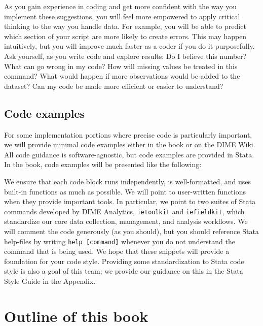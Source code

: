 As you gain experience in coding
and get more confident with the way you implement these suggestions,
you will feel more empowered to apply critical thinking to the way you handle data.
For example, you will be able to predict which section
of your script are more likely to create errors.
This may happen intuitively, but you will improve much faster as a coder
if you do it purposefully.
Ask yourself, as you write code and explore results:
Do I believe this number?
What can go wrong in my code?
How will missing values be treated in this command?
What would happen if more observations would be added to the dataset?
Can my code be made more efficient or easier to understand?

\subsection{Code examples}
For some implementation portions where precise code is particularly important,
we will provide minimal code examples either in the book or on the DIME Wiki.
All code guidance is software-agnostic, but code examples are provided in Stata.
In the book, code examples will be presented like the following:


We ensure that each code block runs independently, is well-formatted,
and uses built-in functions as much as possible.
We will point to user-written functions when they provide important tools.
In particular, we point to two suites of Stata commands developed by DIME Analytics,
\texttt{ietoolkit} and
\texttt{iefieldkit},
which standardize our core data collection, management, and analysis workflows.
We will comment the code generously (as you should),
but you should reference Stata help-files by writing \texttt{help [command]}
whenever you do not understand the command that is being used.
We hope that these snippets will provide a foundation for your code style.
Providing some standardization to Stata code style is also a goal of this team;
we provide our guidance on this in the Stata Style Guide in the Appendix.

\section{Outline of this book}

